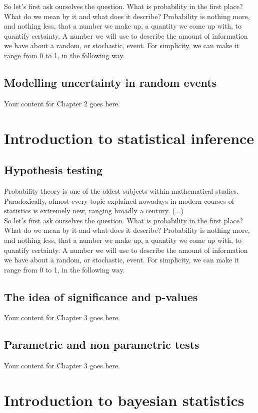 \documentclass{book}
\begin{document}
So let's first ask ourselves the question. What is probability in the first place? What do we mean by it and what does it describe? Probability is nothing more, and nothing less, that a number we make up, a quantity we come up with, to quantify certainty. A number we will use to describe the amount of information we have about a random, or stochastic, event. For simplicity, we can make it range from 0 to 1, in the following way.


\section{Modelling uncertainty in random events}
Your content for Chapter 2 goes here.

\chapter{Introduction to statistical inference}

\section{Hypothesis testing}
Probability theory is one of the oldest subjects within mathematical studies. Paradoxically, almost every topic explained nowadays in modern courses of statistics is extremely new, ranging broadly a century. (...)\\

So let's first ask ourselves the question. What is probability in the first place? What do we mean by it and what does it describe? Probability is nothing more, and nothing less, that a number we make up, a quantity we come up with, to quantify certainty. A number we will use to describe the amount of information we have about a random, or stochastic, event. For simplicity, we can make it range from 0 to 1, in the following way.


\section{The idea of significance and p-values}
Your content for Chapter 3 goes here.

\section{Parametric and non parametric tests}
Your content for Chapter 3 goes here.

\chapter{Introduction to bayesian statistics}
\end{document}
